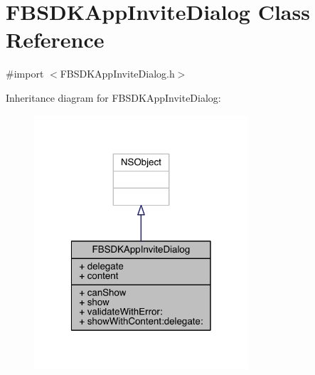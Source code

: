 \hypertarget{interface_f_b_s_d_k_app_invite_dialog}{\section{F\-B\-S\-D\-K\-App\-Invite\-Dialog Class Reference}
\label{interface_f_b_s_d_k_app_invite_dialog}
}


{\ttfamily \#import $<$F\-B\-S\-D\-K\-App\-Invite\-Dialog.\-h$>$}



Inheritance diagram for F\-B\-S\-D\-K\-App\-Invite\-Dialog\-:
\nopagebreak
\begin{figure}[H]
\begin{center}
\leavevmode
\includegraphics[width=226pt]{interface_f_b_s_d_k_app_invite_dialog__inherit__graph}
\end{center}
\end{figure}


